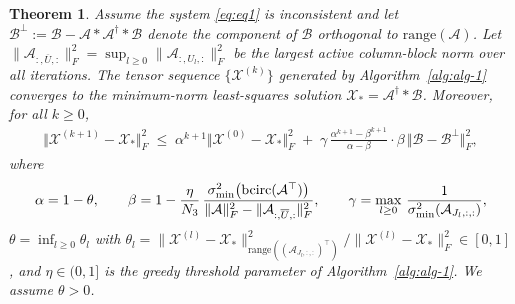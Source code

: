 \documentclass[11pt]{article}
\newtheorem{theorem}{Theorem}[section]
\def\fm#1{\mathcal{#1}}
\begin{document}
\begin{theorem}
Assume the system \eqref{eq:eq1} is inconsistent and let
$\fm B^\perp := \fm B - \fm A * \fm A^\dagger * \fm B$
denote the component of $\fm B$ orthogonal to $\mathrm{range}(\fm A)$.
Let $\|\fm A_{:,\overline{U},:}\|_F^2 = \sup_{l \geq 0}\|\fm A_{:,U_l,:}\|_F^2$
be the largest active column-block norm over all iterations.
The tensor sequence $\{\fm X^{(k)}\}$ generated by Algorithm~\ref{alg:alg-1}
converges to the minimum-norm least-squares solution $\fm X_\ast = \fm A^\dagger * \fm B$.
Moreover, for all $k \geq 0$,
\begin{align}
    \Vert \fm X^{(k+1)} - \fm X_\ast \Vert_F^2
    \;\leq\;
    \alpha^{k+1}\Vert \fm X^{(0)} - \fm X_\ast \Vert_F^2
    \;+\;
    \gamma\,\frac{\alpha^{k+1}-\beta^{k+1}}{\alpha - \beta}
    \cdot\beta
    \,\Vert \fm B - \fm B^\perp \Vert_F^2,
\end{align}
where
\begin{align*}
\alpha = 1 - \theta,
\qquad
\beta  = 1 - \frac{\eta}{N_3}\,
    \frac{\sigma_{\min}^2\!\left(\bcirc(\fm A^\top)\right)}
         {\|\fm A\|_F^2 - \|\fm A_{:,\overline{U},:}\|_F^2},
\qquad
\gamma = \max_{l \geq 0}\,\frac{1}{\sigma_{\min}^2\!\left(\fm A_{J_l,:,:}\right)},
\end{align*}
$\theta = \inf_{l \geq 0}\theta_l$ with
$\theta_l = \|\fm X^{(l)} - \fm X_\ast\|^2_{\mathrm{range}((\fm A_{J_l,:,:})^\top)}\big/
            \|\fm X^{(l)} - \fm X_\ast\|_F^2 \in [0,1]$,
and $\eta \in (0,1]$ is the greedy threshold parameter of Algorithm~\ref{alg:alg-1}.
We assume $\theta > 0$.
\end{theorem}
\end{document}
